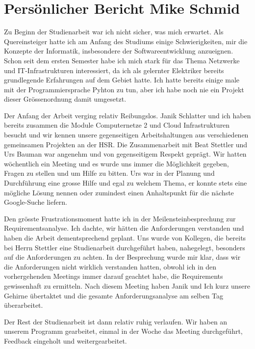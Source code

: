 \documentclass[]{subfiles}
\begin{document}
\section*{Persönlicher Bericht Mike Schmid}
    Zu Beginn der Studienarbeit war ich nicht sicher, was mich erwartet.
    Als Quereinsteiger hatte ich am Anfang des Studiums einige Schwierigkeiten,
    mir die Konzepte der Informatik, insbesondere der Softwareentwicklung anzueignen.
    Schon seit dem ersten Semester habe ich mich stark für das Thema Netzwerke und IT-Infrastrukturen
    interessiert, da ich als gelernter Elektriker bereits grundlegende Erfahrungen auf dem Gebiet hatte.
    Ich hatte bereits einige male mit der Programmiersprache Pyhton zu tun, aber ich habe noch 
    nie ein Projekt dieser Grössenordnung damit umgesetzt.

    Der Anfang der Arbeit verging relativ Reibungslos. 
    Janik Schlatter und ich haben bereits zusammen die Module Computernetze 2 und Cloud Infrastrukturen
    besucht und wir kennen unsere gegenseitigen Arbeitshaltungen aus verschiedenen gemeinsamen
    Projekten an der HSR.
    Die Zusammenarbeit mit Beat Stettler und Urs Bauman war angenehm und von gegenseitigem Respekt
    geprägt.
    Wir hatten wöchentlich ein Meeting und es wurde uns immer die Möglichkeit gegeben,
    Fragen zu stellen und um Hilfe zu bitten.
    Urs war in der Planung und Durchführung eine grosse Hilfe und egal zu welchem Thema, er konnte
    stets eine mögliche Lösung nennen oder zumindest einen Anhaltspunkt für die nächste Google-Suche
    liefern.
    
    Den grösste Frustrationsmoment hatte ich in der Meilensteinbesprechung zur Requirementsanalyse.
    Ich dachte, wir hätten die Anforderungen verstanden und haben die Arbeit dementsprechend geplant.
    Uns wurde von Kollegen, die bereits bei Herrn Stettler eine Studienarbeit durchgeführt haben,
    nahegelegt, besonders auf die Anforderungen zu achten.
    In der Besprechung wurde mir klar, dass wir die Anforderungen nicht wirklich verstanden hatten,
    obwohl ich in den vorhergehenden Meetings immer darauf geachtet habe, die Requirements 
    gewissenhaft zu ermitteln. 
    Nach diesem Meeting haben Janik und Ich kurz unsere Gehirne übertaktet und die gesamte 
    Anforderungsanalyse am selben Tag überarbeitet.
    
    Der Rest der Studienarbeit ist dann relativ ruhig verlaufen.
    Wir haben an unserem Programm gearbeitet, einmal in der Woche das Meeting durchgeführt, 
    Feedback eingeholt und weitergearbeitet.
\end{document}
